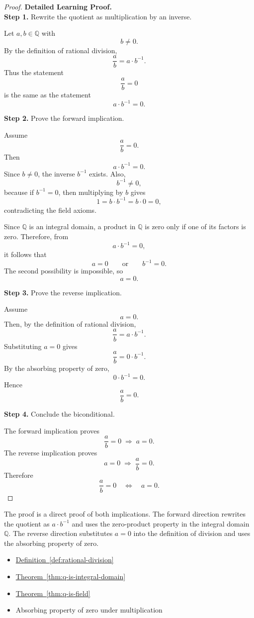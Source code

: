 \begin{proof}
\textbf{Detailed Learning Proof.}~\\

\textbf{Step 1.} Rewrite the quotient as multiplication by an inverse.

Let $a,b\in\mathbb{Q}$ with
\[
b\neq 0.
\]
By the definition of rational division,
\[
\frac{a}{b}=a\cdot b^{-1}.
\]
Thus the statement
\[
\frac{a}{b}=0
\]
is the same as the statement
\[
a\cdot b^{-1}=0.
\]

\textbf{Step 2.} Prove the forward implication.

Assume
\[
\frac{a}{b}=0.
\]
Then
\[
a\cdot b^{-1}=0.
\]
Since $b\neq 0$, the inverse $b^{-1}$ exists. Also,
\[
b^{-1}\neq 0,
\]
because if $b^{-1}=0$, then multiplying by $b$ gives
\[
1=b\cdot b^{-1}=b\cdot 0=0,
\]
contradicting the field axioms.

Since $\mathbb{Q}$ is an integral domain, a product in $\mathbb{Q}$ is
zero only if one of its factors is zero. Therefore, from
\[
a\cdot b^{-1}=0,
\]
it follows that
\[
a=0
\qquad\text{or}\qquad
b^{-1}=0.
\]
The second possibility is impossible, so
\[
a=0.
\]

\textbf{Step 3.} Prove the reverse implication.

Assume
\[
a=0.
\]
Then, by the definition of rational division,
\[
\frac{a}{b}=a\cdot b^{-1}.
\]
Substituting $a=0$ gives
\[
\frac{a}{b}=0\cdot b^{-1}.
\]
By the absorbing property of zero,
\[
0\cdot b^{-1}=0.
\]
Hence
\[
\frac{a}{b}=0.
\]

\textbf{Step 4.} Conclude the biconditional.

The forward implication proves
\[
\frac{a}{b}=0 \;\Longrightarrow\; a=0.
\]
The reverse implication proves
\[
a=0 \;\Longrightarrow\; \frac{a}{b}=0.
\]
Therefore
\[
\frac{a}{b}=0
\quad\Longleftrightarrow\quad
a=0.
\]
\end{proof}

\begin{remark*}
The proof is a direct proof of both implications. The forward direction
rewrites the quotient as $a\cdot b^{-1}$ and uses the zero-product
property in the integral domain $\mathbb{Q}$. The reverse direction
substitutes $a=0$ into the definition of division and uses the absorbing
property of zero.
\end{remark*}

\begin{dependencies}
\begin{itemize}
  \item \hyperref[def:rational-division]{Definition~\ref*{def:rational-division}}
  \item \hyperref[thm:q-is-integral-domain]{Theorem~\ref*{thm:q-is-integral-domain}}
  \item \hyperref[thm:q-is-field]{Theorem~\ref*{thm:q-is-field}}
  \item Absorbing property of zero under multiplication
\end{itemize}
\end{dependencies}
